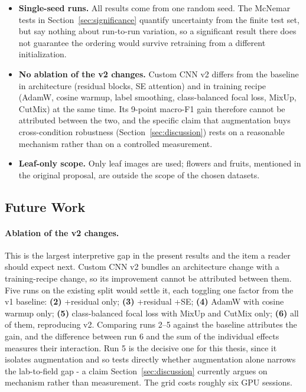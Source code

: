 \documentclass[12pt,a4paper]{article}
\begin{document}
\begin{itemize}
    \item \textbf{Single-seed runs.} All results come from one random seed. The McNemar tests in Section~\ref{sec:significance} quantify uncertainty from the finite test set, but say nothing about run-to-run variation, so a significant result there does not guarantee the ordering would survive retraining from a different initialization.
    \item \textbf{No ablation of the v2 changes.} Custom CNN v2 differs from the baseline in architecture (residual blocks, SE attention) and in training recipe (AdamW, cosine warmup, label smoothing, class-balanced focal loss, MixUp, CutMix) at the same time. Its 9-point macro-F1 gain therefore cannot be attributed between the two, and the specific claim that augmentation buys cross-condition robustness (Section~\ref{sec:discussion}) rests on a reasonable mechanism rather than on a controlled measurement.
    \item \textbf{Leaf-only scope.} Only leaf images are used; flowers and fruits, mentioned in the original proposal, are outside the scope of the chosen datasets.
\end{itemize}

\subsection{Future Work}
\label{sec:futurework}
\paragraph{Ablation of the v2 changes.} This is the largest interpretive gap in the present results and the item a reader should expect next. Custom CNN v2 bundles an architecture change with a training-recipe change, so its improvement cannot be attributed between them. Five runs on the existing split would settle it, each toggling one factor from the v1 baseline: \textbf{(2)} +residual only; \textbf{(3)} +residual +SE; \textbf{(4)} AdamW with cosine warmup only; \textbf{(5)} class-balanced focal loss with MixUp and CutMix only; \textbf{(6)} all of them, reproducing v2. Comparing runs 2--5 against the baseline attributes the gain, and the difference between run 6 and the sum of the individual effects measures their interaction. Run 5 is the decisive one for this thesis, since it isolates augmentation and so tests directly whether augmentation alone narrows the lab-to-field gap - a claim Section~\ref{sec:discussion} currently argues on mechanism rather than measurement. The grid costs roughly six GPU sessions.
\end{document}
